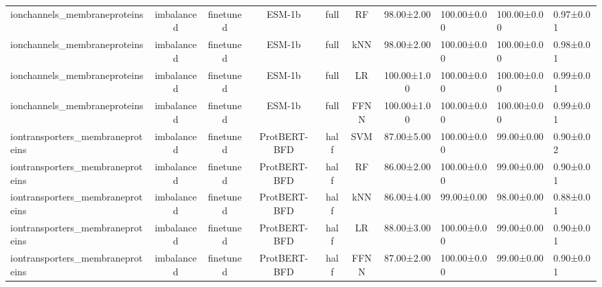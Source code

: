 \begin{tabular}{lcccccc}
    ionchannels\_membraneproteins & imbalanced &      finetuned &       ESM-1b &      full &         RF &  98.00±2.00 & 100.00±0.00 & 100.00±0.00 & 0.97±0.01 \\
    ionchannels\_membraneproteins & imbalanced &      finetuned &       ESM-1b &      full &        kNN &  98.00±2.00 & 100.00±0.00 & 100.00±0.00 & 0.98±0.01 \\
    ionchannels\_membraneproteins & imbalanced &      finetuned &       ESM-1b &      full &         LR & 100.00±1.00 & 100.00±0.00 & 100.00±0.00 & 0.99±0.01 \\
    ionchannels\_membraneproteins & imbalanced &      finetuned &       ESM-1b &      full &       FFNN & 100.00±1.00 & 100.00±0.00 & 100.00±0.00 & 0.99±0.01 \\
iontransporters\_membraneproteins & imbalanced &      finetuned & ProtBERT-BFD &      half &        SVM &  87.00±5.00 & 100.00±0.00 &  99.00±0.00 & 0.90±0.02 \\
iontransporters\_membraneproteins & imbalanced &      finetuned & ProtBERT-BFD &      half &         RF &  86.00±2.00 & 100.00±0.00 &  99.00±0.00 & 0.90±0.01 \\
iontransporters\_membraneproteins & imbalanced &      finetuned & ProtBERT-BFD &      half &        kNN &  86.00±4.00 &  99.00±0.00 &  98.00±0.00 & 0.88±0.01 \\
iontransporters\_membraneproteins & imbalanced &      finetuned & ProtBERT-BFD &      half &         LR &  88.00±3.00 & 100.00±0.00 &  99.00±0.00 & 0.90±0.01 \\
iontransporters\_membraneproteins & imbalanced &      finetuned & ProtBERT-BFD &      half &       FFNN &  87.00±2.00 & 100.00±0.00 &  99.00±0.00 & 0.90±0.01 \\
\bottomrule
\end{tabular}

